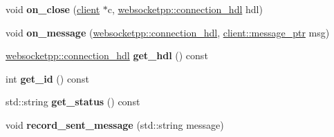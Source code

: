 \begin{DoxyCompactItemize}
\item 
\mbox{\label{classconnection__metadata_ac297cf7710d8d510ef383b7395222ce5}} 
void {\bfseries on\+\_\+close} (\mbox{\hyperlink{classwebsocketpp_1_1client}{client}} $\ast$c, \mbox{\hyperlink{namespacewebsocketpp_a6b3d26a10ee7229b84b776786332631d}{websocketpp\+::connection\+\_\+hdl}} hdl)
\item 
\mbox{\label{classconnection__metadata_a78708ddd026fc4fbff883477c0ed01bf}} 
void {\bfseries on\+\_\+message} (\mbox{\hyperlink{namespacewebsocketpp_a6b3d26a10ee7229b84b776786332631d}{websocketpp\+::connection\+\_\+hdl}}, \mbox{\hyperlink{classwebsocketpp_1_1endpoint_a585ecbbfd9689d4e4229e4c8378bd672}{client\+::message\+\_\+ptr}} msg)
\item 
\mbox{\label{classconnection__metadata_a76a6a10e9192cd0ca03e2a2539cf4549}} 
\mbox{\hyperlink{namespacewebsocketpp_a6b3d26a10ee7229b84b776786332631d}{websocketpp\+::connection\+\_\+hdl}} {\bfseries get\+\_\+hdl} () const
\item 
\mbox{\label{classconnection__metadata_a3f71fbb092ec54e496464e42d960a22d}} 
int {\bfseries get\+\_\+id} () const
\item 
\mbox{\label{classconnection__metadata_aefe28a6b0b27076c685d66727e0f0a9d}} 
std\+::string {\bfseries get\+\_\+status} () const
\item 
\mbox{\label{classconnection__metadata_aa6940efad5f50a3e4f9789d51ebbea75}} 
void {\bfseries record\+\_\+sent\+\_\+message} (std\+::string message)
\end{DoxyCompactItemize}
